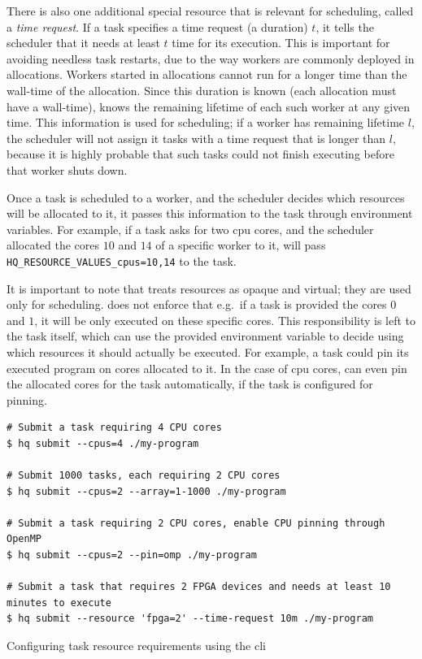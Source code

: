 There is also one additional special resource that is relevant for scheduling, called a
\emph{time request}. If a task specifies a time request (a duration) $t$, it
tells the scheduler that it needs at least $t$ time for its execution. This is
important for avoiding needless task restarts, due to the way \hq{} workers are
commonly deployed in allocations. Workers started in allocations cannot run for a longer time than
the wall-time of the allocation. Since this duration is known (each allocation must have a
wall-time), \hq{} knows the remaining lifetime of each such worker at any given
time. This information is used for scheduling; if a worker has remaining lifetime
$l$, the scheduler will not assign it tasks with a time request that is longer
than $l$, because it is highly probable that such tasks could not finish
executing before that worker shuts down.

Once a task is scheduled to a worker, and the scheduler decides which resources will be allocated
to it, it passes this information to the task through environment variables. For example, if a task
asks for two \gls{cpu} cores, and the scheduler allocated the cores
$10$ and $14$ of a specific worker to it,
\hq{} will pass \texttt{HQ\_RESOURCE\_VALUES\_cpus=10,14} to the task.

It is important to note that \hyperqueue{} treats resources as opaque and virtual; they
are used only for scheduling. \hq{} does not enforce that e.g.\ if a task is
provided the cores $0$ and $1$, it will be only executed on
these specific cores. This responsibility is left to the task itself, which can use the provided
environment variable to decide using which resources it should actually be executed. For example, a
task could pin its executed program on cores allocated to it. In the case of
\gls{cpu} cores, \hq{} can even pin the allocated cores for the
task automatically, if the task is configured for pinning.

\begin{listing}[h]
	\begin{verbatim}
# Submit a task requiring 4 CPU cores
$ hq submit --cpus=4 ./my-program

# Submit 1000 tasks, each requiring 2 CPU cores
$ hq submit --cpus=2 --array=1-1000 ./my-program

# Submit a task requiring 2 CPU cores, enable CPU pinning through OpenMP
$ hq submit --cpus=2 --pin=omp ./my-program

# Submit a task that requires 2 FPGA devices and needs at least 10 minutes to execute
$ hq submit --resource 'fpga=2' --time-request 10m ./my-program
	\end{verbatim}
	\caption{Configuring task resource requirements using the \hyperqueue{} \gls{cli}}
	\label{lst:hq-cli-task-resources}
\end{listing}

